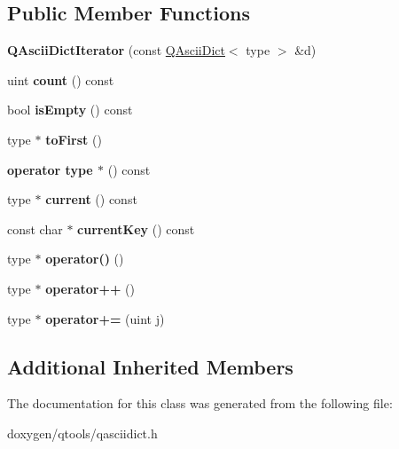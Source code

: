 \subsection*{Public Member Functions}
\begin{DoxyCompactItemize}
\item 
\mbox{\label{class_q_ascii_dict_iterator_a3827c689eb4610420c9d4a47ae9f41af}} 
{\bfseries Q\+Ascii\+Dict\+Iterator} (const \mbox{\hyperlink{class_q_ascii_dict}{Q\+Ascii\+Dict}}$<$ type $>$ \&d)
\item 
\mbox{\label{class_q_ascii_dict_iterator_a31cb18423f1f8691c3198db5307705d7}} 
uint {\bfseries count} () const
\item 
\mbox{\label{class_q_ascii_dict_iterator_a18aa58a5a707d5ef5484c87321a7a7d4}} 
bool {\bfseries is\+Empty} () const
\item 
\mbox{\label{class_q_ascii_dict_iterator_af99d7e6fff55ecd58ef68633e6b17a22}} 
type $\ast$ {\bfseries to\+First} ()
\item 
\mbox{\label{class_q_ascii_dict_iterator_ae8a70c2a4a3e0fb64b7204273266941c}} 
{\bfseries operator type $\ast$} () const
\item 
\mbox{\label{class_q_ascii_dict_iterator_a40bd881bfcc6c4ffa18ae4279ff89584}} 
type $\ast$ {\bfseries current} () const
\item 
\mbox{\label{class_q_ascii_dict_iterator_a7c47e352d73614d4a048c31d676f9edb}} 
const char $\ast$ {\bfseries current\+Key} () const
\item 
\mbox{\label{class_q_ascii_dict_iterator_a84bfab2fda0e401040f5f30c2d3350c8}} 
type $\ast$ {\bfseries operator()} ()
\item 
\mbox{\label{class_q_ascii_dict_iterator_a9e26f1d9b78f7fc1faa85b504fe74db0}} 
type $\ast$ {\bfseries operator++} ()
\item 
\mbox{\label{class_q_ascii_dict_iterator_acd73a2e7762744842753fe0c8a63d67d}} 
type $\ast$ {\bfseries operator+=} (uint j)
\end{DoxyCompactItemize}
\subsection*{Additional Inherited Members}


The documentation for this class was generated from the following file\+:\begin{DoxyCompactItemize}
\item 
doxygen/qtools/qasciidict.\+h\end{DoxyCompactItemize}
